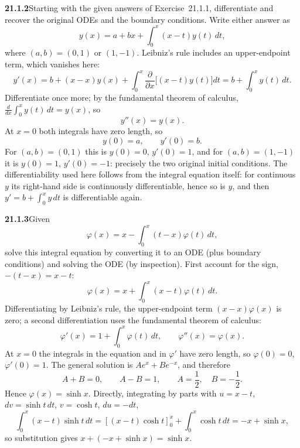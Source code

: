 \par\bigskip
\noindent\textbf{21.1.2}\quad Starting with the given answers of
Exercise~21.1.1, differentiate and recover the original ODEs and
the boundary conditions.
\solution
Write either answer as
\[
y(x)=a+bx+\int_0^x(x-t)y(t)\,dt,
\]
where $(a,b)=(0,1)$ or $(1,-1)$. Leibniz's rule includes an
upper-endpoint term, which vanishes here:
\[
y'(x)=b+(x-x)y(x)+\int_0^x
\frac{\partial}{\partial x}\bigl[(x-t)y(t)\bigr]dt
=b+\int_0^x y(t)\,dt.
\]
Differentiate once more; by the fundamental theorem of calculus,
$\frac{d}{dx}\int_0^xy(t)\,dt=y(x)$, so
\[
\boxed{y''(x)=y(x)}.
\]
At $x=0$ both integrals have zero length, so
\[
y(0)=a,\qquad y'(0)=b.
\]
For $(a,b)=(0,1)$ this is $y(0)=0$, $y'(0)=1$, and for $(a,b)=(1,-1)$
it is $y(0)=1$, $y'(0)=-1$: precisely the two original initial
conditions. The differentiability used here follows from the integral
equation itself: for continuous $y$ its right-hand side is continuously
differentiable, hence so is $y$, and then $y'=b+\int_0^xy\,dt$ is
differentiable again.


\par\bigskip
\noindent\textbf{21.1.3}\quad Given
\[
\varphi(x)=x-\int_{0}^{x}(t-x)\varphi(t)\,dt,
\]
solve this integral equation by converting it to an ODE (plus
boundary conditions) and solving the ODE (by inspection).
\solution
First account for the sign, $-(t-x)=x-t$:
\[
\varphi(x)=x+\int_0^x(x-t)\varphi(t)\,dt.
\]
Differentiating by Leibniz's rule, the upper-endpoint term
$(x-x)\varphi(x)$ is zero; a second differentiation uses the
fundamental theorem of calculus:
\[
\varphi'(x)=1+\int_0^x\varphi(t)\,dt,\qquad
\varphi''(x)=\varphi(x).
\]
At $x=0$ the integrals in the equation and in $\varphi'$ have zero
length, so $\varphi(0)=0$, $\varphi'(0)=1$. The general solution is
$Ae^x+Be^{-x}$, and therefore
\[
A+B=0,\qquad A-B=1,\qquad
A=\frac12,\quad B=-\frac12.
\]
Hence $\boxed{\varphi(x)=\sinh x}$. Directly, integrating by parts
with $u=x-t$, $dv=\sinh t\,dt$, $v=\cosh t$, $du=-dt$,
\[
\int_0^x(x-t)\sinh t\,dt
=\left[(x-t)\cosh t\right]_0^x+\int_0^x\cosh t\,dt
=-x+\sinh x,
\]
so substitution gives $x+(-x+\sinh x)=\sinh x$.


